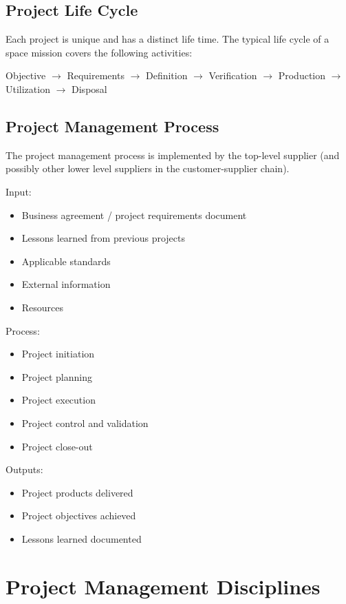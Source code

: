 \subsection{Project Life Cycle}

Each project is unique and has a distinct life time. The typical life cycle of a space mission covers the following activities:

Objective 
$\rightarrow$ Requirements
$\rightarrow$ Definition
$\rightarrow$ Verification
$\rightarrow$ Production
$\rightarrow$ Utilization
$\rightarrow$ Disposal

\subsection{Project Management Process}

The project management process is implemented by the top-level supplier (and possibly other lower level suppliers in the customer-supplier chain).

Input: 
\begin{itemize}
\item Business agreement / project requirements document
\item Lessons learned from previous projects
\item Applicable standards
\item External information
\item Resources 
\end{itemize}

Process:
\begin{itemize}
\item Project initiation
\item Project planning
\item Project execution
\item Project control and validation
\item Project close-out
\end{itemize}

Outputs:
\begin{itemize}
\item Project products delivered
\item Project objectives achieved 
\item Lessons learned documented
\end{itemize}

\section{Project Management Disciplines}

